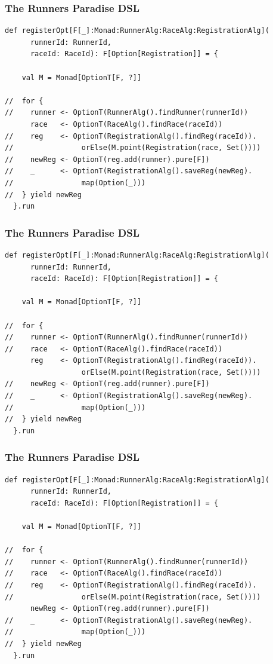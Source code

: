 \documentclass{beamer}
\begin{document}
\begin{frame}[fragile]
  \addtocounter{framenumber}{-1}
  \frametitle{The Runners Paradise DSL}
\begin{verbatim}
def registerOpt[F[_]:Monad:RunnerAlg:RaceAlg:RegistrationAlg](
      runnerId: RunnerId,
      raceId: RaceId): F[Option[Registration]] = {

    val M = Monad[OptionT[F, ?]]

//  for {
//    runner <- OptionT(RunnerAlg().findRunner(runnerId))
      race   <- OptionT(RaceAlg().findRace(raceId))
//    reg    <- OptionT(RegistrationAlg().findReg(raceId)).
//                orElse(M.point(Registration(race, Set())))
//    newReg <- OptionT(reg.add(runner).pure[F])
//    _      <- OptionT(RegistrationAlg().saveReg(newReg).
//                map(Option(_)))
//  } yield newReg
  }.run
\end{verbatim}
\end{frame}

\begin{frame}[fragile]
  \addtocounter{framenumber}{-1}
  \frametitle{The Runners Paradise DSL}
\begin{verbatim}
def registerOpt[F[_]:Monad:RunnerAlg:RaceAlg:RegistrationAlg](
      runnerId: RunnerId,
      raceId: RaceId): F[Option[Registration]] = {

    val M = Monad[OptionT[F, ?]]

//  for {
//    runner <- OptionT(RunnerAlg().findRunner(runnerId))
//    race   <- OptionT(RaceAlg().findRace(raceId))
      reg    <- OptionT(RegistrationAlg().findReg(raceId)).
                  orElse(M.point(Registration(race, Set())))
//    newReg <- OptionT(reg.add(runner).pure[F])
//    _      <- OptionT(RegistrationAlg().saveReg(newReg).
//                map(Option(_)))
//  } yield newReg
  }.run
\end{verbatim}
\end{frame}

\begin{frame}[fragile]
  \addtocounter{framenumber}{-1}
  \frametitle{The Runners Paradise DSL}
\begin{verbatim}
def registerOpt[F[_]:Monad:RunnerAlg:RaceAlg:RegistrationAlg](
      runnerId: RunnerId,
      raceId: RaceId): F[Option[Registration]] = {

    val M = Monad[OptionT[F, ?]]

//  for {
//    runner <- OptionT(RunnerAlg().findRunner(runnerId))
//    race   <- OptionT(RaceAlg().findRace(raceId))
//    reg    <- OptionT(RegistrationAlg().findReg(raceId)).
//                orElse(M.point(Registration(race, Set())))
      newReg <- OptionT(reg.add(runner).pure[F])
//    _      <- OptionT(RegistrationAlg().saveReg(newReg).
//                map(Option(_)))
//  } yield newReg
  }.run
\end{verbatim}
\end{frame}
\end{document}
